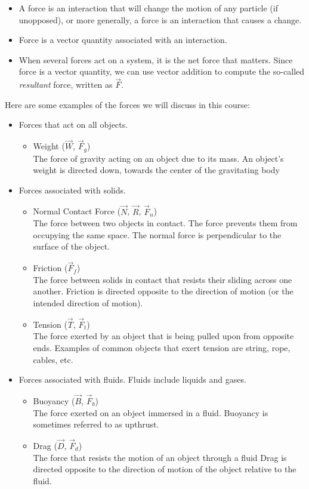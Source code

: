 \begin{itemize}
    \item A force is an interaction that will change the motion of any particle (if unopposed), or more generally, a force is an interaction that causes a change.
    \item Force is a vector quantity associated with an interaction.
    \item When several forces act on a system, it is the net force that matters. Since force is a vector quantity, we can use vector addition to compute the so-called \textit{resultant} force, written as $\vec{F}$.
\end{itemize}
Here are some examples of the forces we will discuss in this course:
\begin{itemize}
    \item Forces that act on all objects.
    \begin{itemize}
        \item Weight ($\vec{W}$, $\vec{F}_g$) \\
        The force of gravity acting on an object due to its mass. An object's weight is directed down, towards the center of the gravitating body
    \end{itemize}
    \item Forces associated with solids.
    \begin{itemize}
        \item Normal Contact Force ($\vec{N}$, $\vec{R}$, $\vec{F}_n$) \\
        The force between two objects in contact. The force prevents them from occupying the same space. The normal force is perpendicular to the surface of the object. 
        \item Friction ($\vec{F}_f$) \\
        The force between solids in contact that resists their sliding across one another. Friction is directed opposite to the direction of motion (or the intended direction of motion).
        \item Tension ($\vec{T}$, $\vec{F}_t$) \\
        The force exerted by an object that is being pulled upon from opposite ends. Examples of common objects that exert tension are string, rope, cables, etc. 
    \end{itemize}
    \item Forces associated with fluids. Fluids include liquids and gases.
    \begin{itemize}
        \item Buoyancy ($\vec{B}$, $\vec{F}_b$) \\
        The force exerted on an object immersed in a fluid. Buoyancy is sometimes referred to as upthrust.
        \item Drag ($\vec{D}$, $\vec{F}_d$) \\
        The force that resists the motion of an object through a fluid Drag is directed opposite to the direction of motion of the object relative to the fluid.
    \end{itemize}
\end{itemize}

